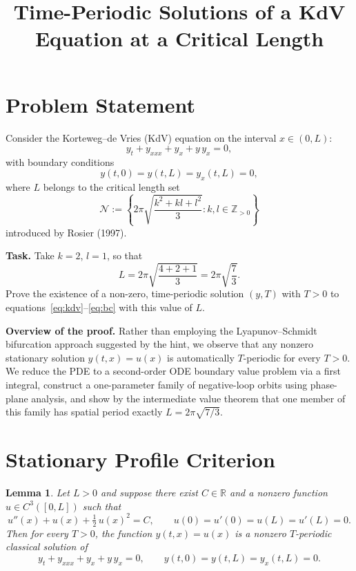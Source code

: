 \documentclass{article}
\title{Time-Periodic Solutions of a KdV Equation at a Critical Length}
\author{}
\date{}
\newtheorem{lemma}{Lemma}
\begin{document}
\maketitle

\section*{Problem Statement}

Consider the Korteweg--de Vries (KdV) equation on the interval $x \in (0, L)$:
\begin{equation}\label{eq:kdv}
y_t + y_{xxx} + y_x + y\, y_x = 0,
\end{equation}
with boundary conditions
\begin{equation}\label{eq:bc}
y(t, 0) = y(t, L) = y_x(t, L) = 0,
\end{equation}
where $L$ belongs to the critical length set
\[
\mathcal{N} := \left\{ 2\pi \sqrt{\frac{k^2 + kl + l^2}{3}} : k, l \in \mathbb{Z}_{>0} \right\}
\]
introduced by Rosier (1997).

\medskip\noindent
\textbf{Task.} Take $k = 2$, $l = 1$, so that
\[
L = 2\pi \sqrt{\frac{4 + 2 + 1}{3}} = 2\pi\sqrt{\frac{7}{3}}.
\]
Prove the existence of a non-zero, time-periodic solution $(y, T)$ with $T > 0$ to equations~\eqref{eq:kdv}--\eqref{eq:bc} with this value of $L$.

\medskip\noindent
\textbf{Overview of the proof.} Rather than employing the Lyapunov--Schmidt bifurcation approach suggested by the hint, we observe that any nonzero stationary solution $y(t,x) = u(x)$ is automatically $T$-periodic for every $T > 0$. We reduce the PDE to a second-order ODE boundary value problem via a first integral, construct a one-parameter family of negative-loop orbits using phase-plane analysis, and show by the intermediate value theorem that one member of this family has spatial period exactly $L = 2\pi\sqrt{7/3}$.

\section{Stationary Profile Criterion}

\begin{lemma}\label{lem:stationary}
Let $L > 0$ and suppose there exist $C \in \mathbb{R}$ and a nonzero function $u \in C^3([0,L])$ such that
\[
u''(x) + u(x) + \tfrac{1}{2}\,u(x)^2 = C, \qquad u(0) = u'(0) = u(L) = u'(L) = 0.
\]
Then for every $T > 0$, the function $y(t,x) = u(x)$ is a nonzero $T$-periodic classical solution of
\[
y_t + y_{xxx} + y_x + y\,y_x = 0, \qquad y(t,0) = y(t,L) = y_x(t,L) = 0.
\]
\end{lemma}
\end{document}
